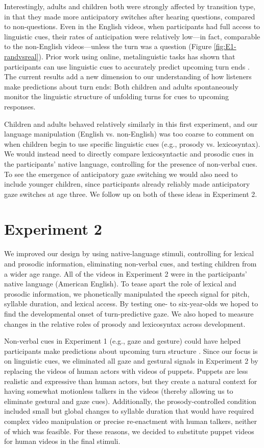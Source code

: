\documentclass[authoryear, 12pt]{elsarticle}
\begin{document}
Interestingly, adults and children both were strongly affected by transition type, in that they made more anticipatory switches after hearing questions, compared to non-questions. Even in the English videos, when participants had full access to linguistic cues, their rates of anticipation were relatively low---in fact, comparable to the non-English videos---unless the turn was a question (Figure \ref{fig:E1-randvsreal}). Prior work using online, metalinguistic tasks has shown that participants can use linguistic cues to accurately predict upcoming turn ends \citep{torreira2015, magyari12, de-ruiter2006}. The current results add a new dimension to our understanding of how listeners make predictions about turn ends: Both children and adults spontaneously monitor the linguistic structure of unfolding turns for cues to upcoming responses.

Children and adults behaved relatively similarly in this first experiment, and our language manipulation (English vs. non-English) was too coarse to comment on when children begin to use specific linguistic cues (e.g., prosody vs. lexicosyntax). We would instead need to directly compare lexicosyntactic and prosodic cues in the participants' native language, controlling for the presence of non-verbal cues. To see the emergence of anticipatory gaze switching we would also need to include younger children, since participants already reliably made anticipatory gaze switches at age three. We follow up on both of these ideas in Experiment 2. 

\section{Experiment 2}
\label{sec:exp2}

We improved our design by using native-language stimuli, controlling for lexical and prosodic information, eliminating non-verbal cues, and testing children from a wider age range. All of the videos in Experiment 2 were in the participants' native language (American English). To tease apart the role of lexical and prosodic information, we phonetically manipulated the speech signal for pitch, syllable duration, and lexical access. By testing one- to six-year-olds we hoped to find the developmental onset of turn-predictive gaze. We also hoped to measure changes in the relative roles of prosody and lexicosyntax across development.

Non-verbal cues in Experiment 1 (e.g., gaze and gesture) could have helped participants make predictions about upcoming turn structure  \citep{rossano2009, stivers2010}. Since our focus is on linguistic cues, we eliminated all gaze and gestural signals in Experiment 2 by replacing the videos of human actors with videos of puppets. Puppets are less realistic and expressive than human actors, but they create a natural context for having somewhat motionless talkers in the videos (thereby allowing us to eliminate gestural and gaze cues). Additionally, the prosody-controlled condition included small but global changes to syllable duration that would have required complex video manipulation or precise re-enactment with human talkers, neither of which was feasible. For these reasons, we decided to substitute puppet videos for human videos in the final stimuli. 
\end{document}
